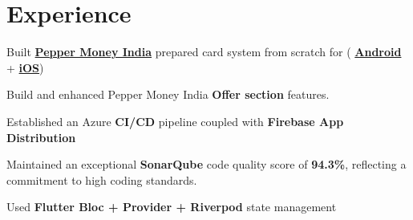 \documentclass[]{deedy-resume-openfont}
\begin{document}
%
%
\lastupdated

%
%

%
%

\begin{minipage}[t]{0.66\textwidth} 



\section{Experience}

\vspace{\topsep} %
\begin{tightemize}
\item Built \href{https://peppermoney.in}{\bf Pepper Money India} prepared card system from scratch for ( \href{https://play.google.com/store/apps/details?id=in.peppermoney.android&hl=en-IN}{\bf Android} + \href{https://apps.apple.com/in/app/pepper-money-prepaid-card/id6468378448}{\bf iOS})
\item Build and enhanced Pepper Money India {\bf Offer section} features.
\item Established an Azure {\bf CI/CD} pipeline coupled with {\bf Firebase App Distribution}
\item Maintained an exceptional {\bf SonarQube} code quality score of {\bf 94.3\%}, reflecting a commitment to high coding standards.
\item Used {\bf Flutter Bloc + Provider + Riverpod} state management

\end{tightemize}
\sectionsep


\end{minipage}
\end{document}
